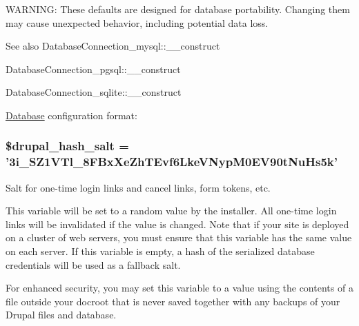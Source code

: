 WARNING: These defaults are designed for database portability. Changing them may cause unexpected behavior, including potential data loss.

\begin{DoxySeeAlso}{See also}
DatabaseConnection\_\-mysql::\_\-\_\-construct 

DatabaseConnection\_\-pgsql::\_\-\_\-construct 

DatabaseConnection\_\-sqlite::\_\-\_\-construct
\end{DoxySeeAlso}
\hyperlink{classDatabase}{Database} configuration format: 
 \hypertarget{settings_8php_a75c981b07486dd3b07d5f122702dd87e}{
\subsubsection[{\$drupal\_\-hash\_\-salt}]{\setlength{\rightskip}{0pt plus 5cm}\$drupal\_\-hash\_\-salt = '3i\_\-SZ1VTl\_\-8FBxXeZhTEvf6LkeVNypM0EV90tNuHs5k'}}
\label{settings_8php_a75c981b07486dd3b07d5f122702dd87e}
Salt for one-\/time login links and cancel links, form tokens, etc.

This variable will be set to a random value by the installer. All one-\/time login links will be invalidated if the value is changed. Note that if your site is deployed on a cluster of web servers, you must ensure that this variable has the same value on each server. If this variable is empty, a hash of the serialized database credentials will be used as a fallback salt.

For enhanced security, you may set this variable to a value using the contents of a file outside your docroot that is never saved together with any backups of your Drupal files and database.


